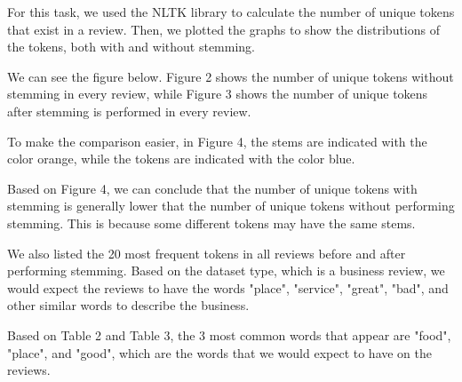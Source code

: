 For this task, we used the NLTK library to calculate the number of unique tokens that exist in a review. Then, we plotted the graphs to show the distributions of the tokens, both with and without stemming.

We can see the figure below. Figure 2 shows the number of unique tokens without stemming in every review, while Figure 3 shows the number of unique tokens after stemming is performed in every review.

To make the comparison easier, in Figure 4, the stems are indicated with the color orange, while the tokens are indicated with the color blue.

Based on Figure 4, we can conclude that the number of unique tokens with stemming is generally lower that the number of unique tokens without performing stemming. This is because some different tokens may have the same stems.

We also listed the 20 most frequent tokens in all reviews before and after performing stemming. Based on the dataset type, which is a business review, we would expect the reviews to have the words "place", "service", "great", "bad", and other similar words to describe the business.

Based on Table 2 and Table 3, the 3 most common words that appear are "food", "place", and "good", which are the words that we would expect to have on the reviews.